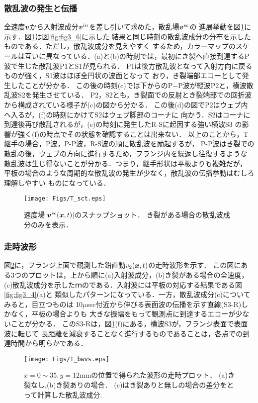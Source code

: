 \subsubsection{散乱波の発生と伝播}
全速度$\mbox{\boldmath $v$}$から入射波成分$\mbox{\boldmath $v$}^{in}$を差し引いて求めた，散乱場$\mbox{\boldmath $v$}^{sc}$の
進展挙動を図\ref{fig:fig3_7}に示す．図\ref{fig:fig3_7}は図\ref{fig:fig3_6}に示した
結果と同じ時刻の散乱波成分の分布を示したものである．ただし，散乱波成分を見えやすく
するため，カラーマップのスケールは互いに異なっている．(a)と(b)の時刻では，最初にき裂へ直接到達するP波で生じた散乱波P1とS1が見られる．
P1は後方散乱波となって入射方向に戻るものが強く，S1波はほぼ全円状の波面となって
おり，き裂端部エコーとして発生したことが分かる．
この後の時刻(c)では下からのP−P波が縦波P2と，横波散乱波S2を発生させている．
P2，S2とも，き裂面での反射とき裂端部での回折波から構成されている様子が(c)の図から分かる．
この後(d)の図でP2はウェブ内へ入るが，(f)の時刻にかけてS2はウェブ脚部のコーナに
向かう．S2はコーナに到達後再び散乱されるが，(e)の時刻に発生したR-Sに起因する強い横波S3
の影響が強く(f)の時点でその状態を確認することは出来ない．
以上のことから，T継手の場合，P波，P-P波，R-S波の順に散乱波を励起するが，
P-P波はき裂での散乱の後，ウェブの方向に進行するため，フランジ内を繰返し往復するような
散乱波は生じ得ないことが分かる．つまり，継手形状は平板よりも複雑だが，
平板の場合のような周期的な散乱波の発生が少なく，散乱波の伝播挙動はむしろ理解しやすい
ものになっている．
\begin{figure}[h]
	\begin{center}
	\texttt{[image: Figs/T\_sct.eps]} 
	\end{center}
	\caption{
		速度場$|\mbox{\boldmath $v$}^{sc}(\mbox{\boldmath $x$},t)|$のスナップショット．
		き裂がある場合の散乱波成分のみを表示．
	} 
	\label{fig:fig3_7}
\end{figure}
\subsubsection{走時波形}
図\ref{fig:fig3_8}に，フランジ上面で観測した鉛直動$v_2(\mbox{\boldmath $x$},t)$の走時波形を示す．
この図にある3つのプロットは，上から順に(a)入射波成分，(b)き裂がある場合の全速度，
(c)散乱波成分を示したｍのである．入射波には平板の対応する結果である図\ref{fig:fig3_4}(a)と
類似したパターンになっている．一方，散乱波成分(c)についてみると，目立つものは
10$\mu$sec付近から伸びる表面波の伝播を示す直線(S3-R)しかなく，平板の場合よりも
大きな振幅をもって観測点に到達するエコーが少ないことが分かる．
このS3-Rは，図\ref{fig:fig3_7}(f)にある，横波S3が，フランジ表面で表面波に転じて
長距離を減衰することなく進行するものであることは，各点での到達時間から明らかである．
\begin{figure}[h]
	\begin{center}
	\texttt{[image: Figs/T\_bwvs.eps]} 
	\end{center}
	\caption{
		$x=0\sim35, y=12$mmの位置で得られた波形の走時プロット．
		(a)き裂なし,(b)き裂ありの場合．
		(c)はき裂ありと無しの場合の差分をとって計算した散乱波成分.
	} 
	\label{fig:fig3_8}
\end{figure}


